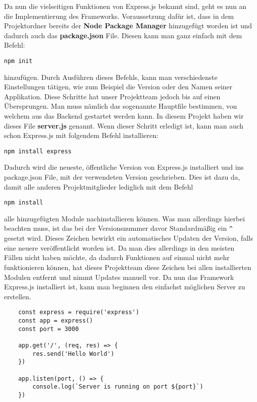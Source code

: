 Da nun die vielseitigen Funktionen von Express.js bekannt sind, geht es nun an die Implementierung des Frameworks. Voraussetzung dafür ist, dass in dem Projektordner bereits der \textbf{Node Package Manager} hinzugefügt worden ist und dadurch auch das \textbf{package.json} File. Diesen kann man ganz einfach mit dem Befehl:
\begin{verbatim}
npm init
\end{verbatim}
hinzufügen. Durch Ausführen dieses Befehls, kann man verschiedenste Einstellungen tätigen, wie zum Beispiel die Version oder den Namen seiner Applikation. Diese Schritte hat unser Projektteam jedoch bis auf einen Übersprungen. Man muss nämlich das sogenannte Hauptfile bestimmen, von welchem aus das Backend gestartet werden kann. In diesem Projekt haben wir dieses File \textbf{server.js} genannt. Wenn dieser Schritt erledigt ist, kann man auch schon Express.js mit folgendem Befehl installieren:
\begin{verbatim}
npm install express
\end{verbatim}
Dadurch wird die neueste, öffentliche Version von Express.js installiert und ins package.json File, mit der verwendeten Version geschrieben. Dies ist dazu da, damit alle anderen Projektmitglieder lediglich mit dem Befehl
\begin{verbatim}
npm install
\end{verbatim}
alle hinzugefügten Module nachinstallieren können. Was man allerdings hierbei beachten muss, ist das bei der Versionsnummer davor Standardmäßig ein \verb|^| gesetzt wird. Dieses Zeichen bewirkt ein automatisches Updaten der Version, falls eine neuere veröffentlicht worden ist. Da man dies allerdings in den meisten Fällen nicht haben möchte, da dadurch Funktionen auf einmal nicht mehr funktionieren können, hat dieses Projektteam diese Zeichen bei allen installierten Modulen entfernt und nimmt Updates manuell vor.
\newline
\cite{installing_express_js}
\newline
Da nun das Framework Express.js installiert ist, kann man beginnen den einfachst möglichen Server zu erstellen.
\begin{lstlisting}
    const express = require('express')
    const app = express()
    const port = 3000

    app.get('/', (req, res) => {
        res.send('Hello World')
    })

    app.listen(port, () => {
        console.log(`Server is running on port ${port}`)
    })
\end{lstlisting}
